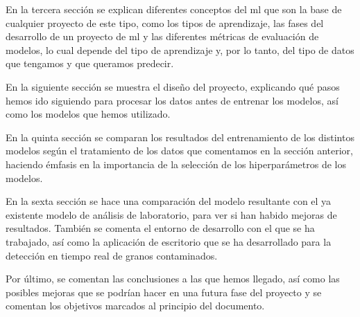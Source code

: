En la tercera sección se explican diferentes conceptos del \gls{ml} que son la base de cualquier proyecto de este tipo, como los tipos de aprendizaje, las fases del desarrollo de un proyecto de \gls{ml} y las diferentes métricas de evaluación de modelos, lo cual depende del tipo de aprendizaje y, por lo tanto, del tipo de datos que tengamos y que queramos predecir.

En la siguiente sección se muestra el diseño del proyecto, explicando qué pasos hemos ido siguiendo para procesar los datos antes de entrenar los modelos, así como los modelos que hemos utilizado.

En la quinta sección se comparan los resultados del entrenamiento de los distintos modelos según el tratamiento de los datos que comentamos en la sección anterior, haciendo émfasis en la importancia de la selección de los hiperparámetros de los modelos.

En la sexta sección se hace una comparación del modelo resultante con el ya existente modelo de análisis de laboratorio, para ver si han habido mejoras de resultados. También se comenta el entorno de desarrollo con el que se ha trabajado, así como la aplicación de escritorio que se ha desarrollado para la detección en tiempo real de granos contaminados.

Por último, se comentan las conclusiones a las que hemos llegado, así como las posibles mejoras que se podrían hacer en una futura fase del proyecto y se comentan los objetivos marcados al principio del documento.
